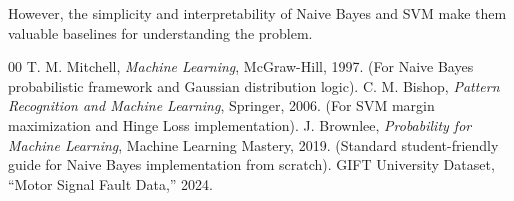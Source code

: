 \documentclass[conference]{IEEEtran}
\begin{document}
However, the simplicity and interpretability of Naive Bayes and SVM make them valuable baselines for understanding the problem.

\begin{thebibliography}{00}
 T. M. Mitchell, \textit{Machine Learning}, McGraw-Hill, 1997. (For Naive Bayes probabilistic framework and Gaussian distribution logic).
 C. M. Bishop, \textit{Pattern Recognition and Machine Learning}, Springer, 2006. (For SVM margin maximization and Hinge Loss implementation).
 J. Brownlee, \textit{Probability for Machine Learning}, Machine Learning Mastery, 2019. (Standard student-friendly guide for Naive Bayes implementation from scratch).
 GIFT University Dataset, ``Motor Signal Fault Data,'' 2024.
\end{thebibliography}
\end{document}
